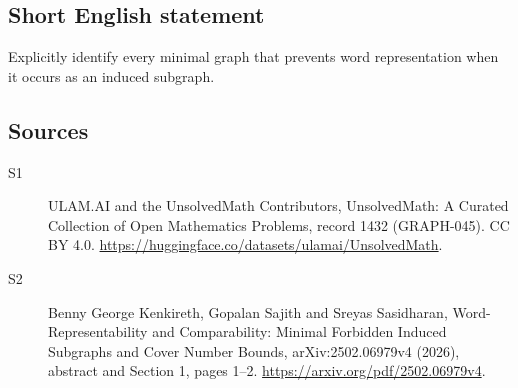 \documentclass[11pt]{article}
\begin{document}
\subsection{Short English statement}
Explicitly identify every minimal graph that prevents word representation when it occurs as an induced subgraph.
\subsection{Sources}
\begin{description}
\item[\hypertarget{source:1432:1}{S1}] ULAM.AI and the UnsolvedMath Contributors, UnsolvedMath: A Curated Collection of Open Mathematics Problems, record 1432 (GRAPH-045). CC BY 4.0. \url{https://huggingface.co/datasets/ulamai/UnsolvedMath}.
\item[\hypertarget{source:1432:2}{S2}] Benny George Kenkireth, Gopalan Sajith and Sreyas Sasidharan, Word-Representability and Comparability: Minimal Forbidden Induced Subgraphs and Cover Number Bounds, arXiv:2502.06979v4 (2026), abstract and Section 1, pages 1--2. \url{https://arxiv.org/pdf/2502.06979v4}.
\end{description}
\label{end:1432}
\end{document}
